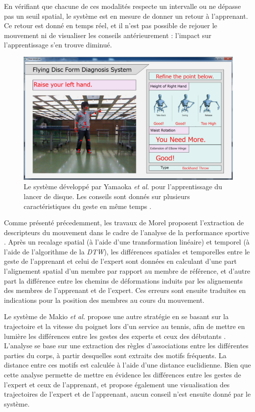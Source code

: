 En vérifiant que chacune de ces modalités respecte un intervalle ou ne dépasse pas un seuil spatial, le système est en mesure de donner un retour à l'apprenant. Ce retour est donné en temps réel, et il n'est pas possible de rejouer le mouvement ni de visualiser les conseils antérieurement : l'impact sur l'apprentissage s'en trouve diminué.

\begin{figure}
    \centering
    \includegraphics[width=\textwidth]{pictures/flying_disc_TEL.png}
    \caption[Système d'apprentissage du lancer de disque \parencite{Yamaoka2013FoF}]{Le système développé par Yamaoka \textit{et al.} pour l'apprentissage du lancer de disque. Les conseils sont donnés sur plusieurs caractéristiques du geste en même temps \parencite{Yamaoka2013FoF}.}
    \label{fig:flying_disc_TEL}
\end{figure}

Comme présenté précedemment, les travaux de Morel proposent l'extraction de descripteurs du mouvement dans le cadre de l'analyse de la performance sportive \parencite{Morel2017Mts}. Après un recalage spatial (à l'aide d'une transformation linéaire) et temporel (à l'aide de l'algorithme de la \textit{DTW}), les différences spatiales et temporelles entre le geste de l'apprenant et celui de l'expert sont données en calculant d'une part l'alignement spatial d'un membre par rapport au membre de référence, et d'autre part la différence entre les chemins de déformations induits par les alignements des membres de l'apprenant et de l'expert. Ces erreurs sont ensuite traduites en indications pour la position des membres au cours du mouvement.


Le système de Makio \textit{et al.} propose une autre stratégie en se basant sur la trajectoire et la vitesse du poignet lors d'un service au tennis, afin de mettre en lumière les différences entre les gestes des experts et ceux des débutants \parencite{Makio2007DoS}. L'analyse se base sur une extraction des règles d'associations entre les différentes parties du corps, à partir desquelles sont extraits des motifs fréquents. La distance entre ces motifs est calculée à l'aide d'une distance euclidienne. Bien que cette analyse permette de mettre en évidence les différences entre les gestes de l'expert et ceux de l'apprenant, et propose également une visualisation des trajectoires de l'expert et de l'apprenant, aucun conseil n'est ensuite donné par le système.

